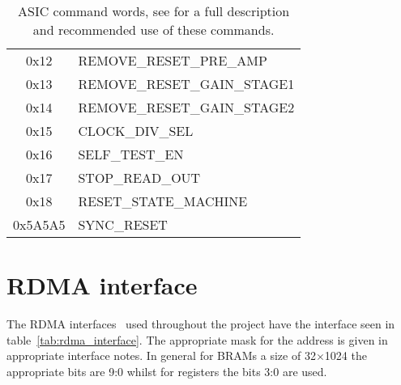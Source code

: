 \documentclass[]{report}
\begin{document}
\begin{table}
\begin{center}
\begin{tabular}{c | l}
                0x12 & REMOVE\_RESET\_PRE\_AMP \\
                0x13 & REMOVE\_RESET\_GAIN\_STAGE1 \\
                0x14 & REMOVE\_RESET\_GAIN\_STAGE2 \\
                0x15 & CLOCK\_DIV\_SEL \\
                0x16 & SELF\_TEST\_EN \\
                0x17 & STOP\_READ\_OUT \\
                0x18 & RESET\_STATE\_MACHINE \\
                0x5A5A5 & SYNC\_RESET \\
            \end{tabular}
        \end{center}
        \caption{ASIC command words, see \cite{REF FOR LPD ASIC} for a full description and recommended use of these commands.}
        \label{tab:asic_command_words}
    \end{table}
    \chapter{RDMA interface} %
    \label{sec:rdma_interface}
    The RDMA interfaces~\cite{RDMA INTERFACE} used throughout the project have the interface seen in table~\ref{tab:rdma_interface}. The appropriate mask for the address is given in appropriate interface notes. In general for BRAMs a size of 32\(\times\)1024 the appropriate bits are 9:0 whilst for registers the bits 3:0 are used. 
    
\end{document}
